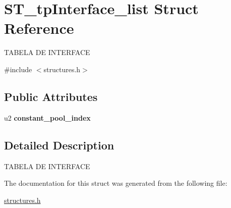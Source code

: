 \hypertarget{structST__tpInterface__list}{}\section{S\+T\+\_\+tp\+Interface\+\_\+list Struct Reference}
\label{structST__tpInterface__list}




 T\+A\+B\+E\+LA DE I\+N\+T\+E\+R\+F\+A\+CE  




{\ttfamily \#include $<$structures.\+h$>$}

\subsection*{Public Attributes}
\begin{DoxyCompactItemize}
\item 
\mbox{\label{structST__tpInterface__list_a7dde78d5d5e9e21938781caf9b3e5263}} 
u2 {\bfseries constant\+\_\+pool\+\_\+index}
\end{DoxyCompactItemize}


\subsection{Detailed Description}


 T\+A\+B\+E\+LA DE I\+N\+T\+E\+R\+F\+A\+CE 

The documentation for this struct was generated from the following file\+:\begin{DoxyCompactItemize}
\item 
\mbox{\hyperlink{structures_8h}{structures.\+h}}\end{DoxyCompactItemize}
